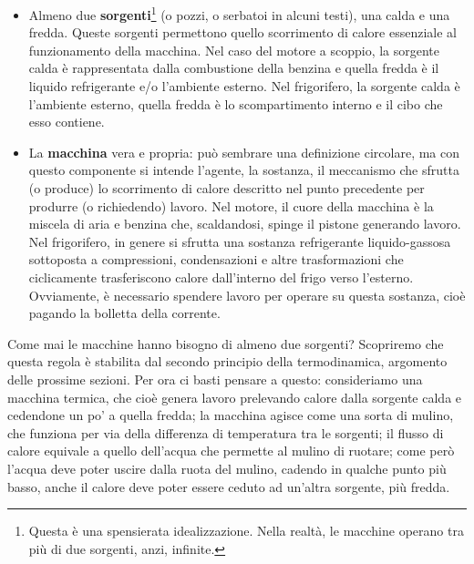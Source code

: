 \begin{itemize}
    \item Almeno due \textbf{sorgenti}\footnote{Questa è una
    spensierata idealizzazione. Nella realtà, le macchine
    operano tra più di due sorgenti, anzi, infinite.} (o pozzi, o serbatoi in alcuni
    testi), una calda e una fredda. Queste sorgenti
    permettono quello scorrimento di calore essenziale al
    funzionamento della macchina. Nel caso
    del motore a scoppio, la sorgente calda è rappresentata dalla
    combustione della benzina e quella fredda è il
    liquido refrigerante e/o l'ambiente esterno. Nel
    frigorifero, la sorgente calda è l'ambiente esterno,
    quella fredda è lo scompartimento interno e il
    cibo che esso contiene.

    \item La \textbf{macchina} vera e propria: può sembrare
    una definizione circolare, ma con questo componente
    si intende l'agente, la sostanza, il meccanismo
    che sfrutta (o produce) lo scorrimento di
    calore descritto nel punto precedente per
    produrre (o richiedendo) lavoro. Nel motore,
    il cuore della macchina è la miscela di aria
    e benzina che, scaldandosi, spinge il pistone
    generando lavoro. Nel frigorifero, in genere si
    sfrutta una sostanza refrigerante liquido-gassosa
    sottoposta a compressioni, condensazioni e altre
    trasformazioni che ciclicamente trasferiscono
    calore dall'interno del frigo verso l'esterno.
    Ovviamente, è necessario spendere lavoro per
    operare su questa sostanza, cioè pagando la
    bolletta della corrente.
\end{itemize}

Come mai le macchine hanno bisogno di almeno due sorgenti?
Scopriremo che questa regola è stabilita dal secondo principio
della termodinamica, argomento delle prossime sezioni.
Per ora ci basti pensare a questo:
consideriamo una macchina termica, che cioè genera lavoro
prelevando calore dalla sorgente calda e cedendone un po' a
quella fredda; la macchina agisce come
una sorta di mulino, che funziona per via della differenza
di temperatura tra le sorgenti; il flusso di calore equivale
a quello dell'acqua che permette al mulino di ruotare; come
però l'acqua deve poter uscire dalla ruota del mulino, cadendo
in qualche punto più basso, anche
il calore deve poter essere ceduto ad un'altra sorgente, più
fredda.


